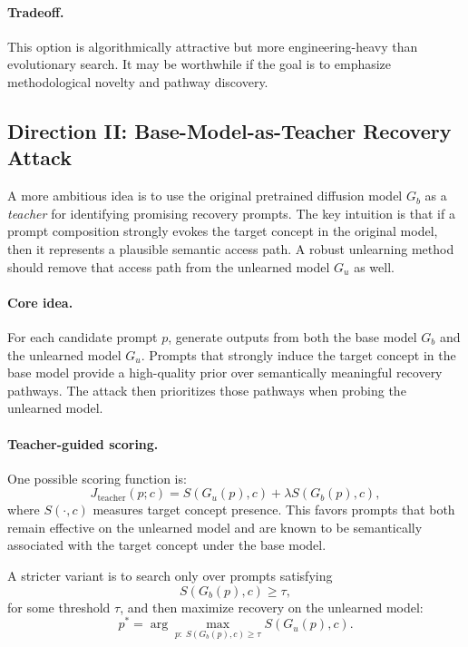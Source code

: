\paragraph{Tradeoff.}
This option is algorithmically attractive but more engineering-heavy than evolutionary search. It may be worthwhile if the goal is to emphasize methodological novelty and pathway discovery.

\subsection{Direction II: Base-Model-as-Teacher Recovery Attack}
\label{subsec:teacher_attack}

A more ambitious idea is to use the original pretrained diffusion model $G_b$ as a \emph{teacher} for identifying promising recovery prompts. The key intuition is that if a prompt composition strongly evokes the target concept in the original model, then it represents a plausible semantic access path. A robust unlearning method should remove that access path from the unlearned model $G_u$ as well.

\paragraph{Core idea.}
For each candidate prompt $p$, generate outputs from both the base model $G_b$ and the unlearned model $G_u$. Prompts that strongly induce the target concept in the base model provide a high-quality prior over semantically meaningful recovery pathways. The attack then prioritizes those pathways when probing the unlearned model.

\paragraph{Teacher-guided scoring.}
One possible scoring function is:
\begin{equation}
J_{\mathrm{teacher}}(p;c)
=
S(G_u(p), c)
+
\lambda S(G_b(p), c),
\label{eq:teacher_score_simple}
\end{equation}
where $S(\cdot,c)$ measures target concept presence. This favors prompts that both remain effective on the unlearned model and are known to be semantically associated with the target concept under the base model.

A stricter variant is to search only over prompts satisfying
\[
S(G_b(p), c) \ge \tau,
\]
for some threshold $\tau$, and then maximize recovery on the unlearned model:
\begin{equation}
p^* = \arg\max_{p:\; S(G_b(p),c)\ge\tau} S(G_u(p), c).
\label{eq:teacher_filtered_attack}
\end{equation}

